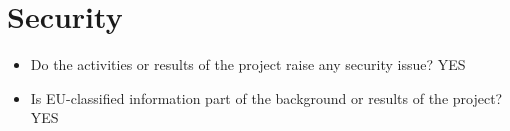\section{Security}

\begin{itemize}
	\item Do the activities or results of the project raise any security issue? YES

	\item Is EU-classified information part of the background or results of the project? YES
	
\end{itemize}
